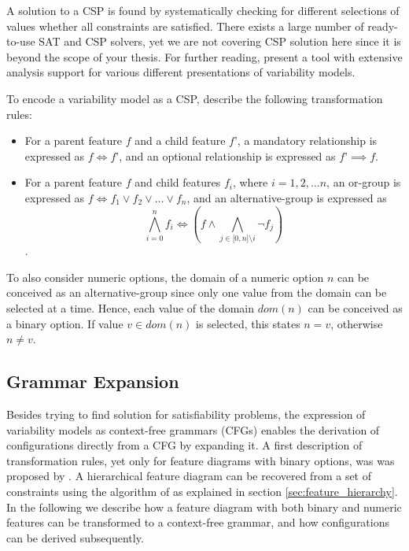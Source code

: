 A solution to a CSP is found by systematically checking for different
selections of values whether all constraints are satisfied. There exists a
large number of ready-to-use SAT and CSP solvers, yet we are not covering CSP
solution here since it is beyond the scope of your thesis. For further reading, 
\citep{benavides_fama:_2007} present a tool with extensive analysis support for
various different presentations of variability models.

To encode a variability model as a CSP, \cite{benavides_automated_2005} describe
the following transformation rules:

\begin{itemize}
  \item For a parent feature $f$ and a child feature $f’$, a mandatory
  relationship is expressed as $f \Leftrightarrow f’$, and an optional relationship is
  expressed as $f’ \implies f$.
    \item  For a parent feature $f$ and child features $f_i$, where $i = 1, 2,
    \ldots n$, an or-group is expressed as $f \Leftrightarrow f_1 \lor f_2 \lor
    \ldots \lor f_n$, and an alternative-group is expressed as $$\bigwedge_{i
    = 0}^n f_i \Leftrightarrow (f \land \bigwedge_{j \in \lbrack 0, n \rbrack
    \setminus i} \neg f_j) $$.
\end{itemize}

To also consider numeric options, the domain of a numeric option $n$ can be
conceived as an alternative-group since only one value from the domain can be
selected at a time. Hence, each value of the domain $dom(n)$ can be conceived as
a binary option. If value $v \in dom(n)$ is selected, this states $n = v$,
otherwise $n \neq v$.


\subsection{Grammar Expansion}
Besides trying to find solution for satisfiability problems, the expression of
variability models as context-free grammars (CFGs) enables the derivation of
configurations directly from a CFG by expanding it. A
first description of transformation rules, yet only for feature diagrams with
binary options, was was proposed by \cite{batory_feature_2005}. A hierarchical feature diagram
can be recovered from a set of constraints using the algorithm of
\cite{she_reverse_2011} as explained in section \ref{sec:feature_hierarchy}.
In the following we describe
how a feature diagram with both binary and numeric features can be transformed
to a context-free grammar, and how configurations can be derived subsequently.

